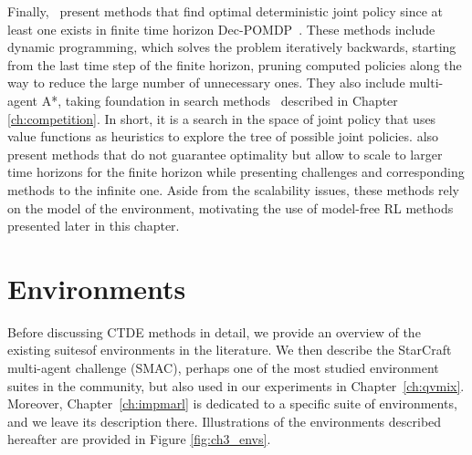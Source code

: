 Finally,~\cite{DecPomdp} present methods that find optimal deterministic joint policy since at least one exists in finite time horizon Dec-POMDP~\citep{oliehoek2008optimal}.
These methods include dynamic programming, which solves the problem iteratively backwards, starting from the last time step of the finite horizon, pruning computed policies along the way to reduce the large number of unnecessary ones.
They also include multi-agent A*, taking foundation in search methods~\citep{russel2010} described in Chapter \ref{ch:competition}.
In short, it is a search in the space of joint policy that uses value functions as heuristics to explore the tree of possible joint policies.
\cite{DecPomdp} also present methods that do not guarantee optimality but allow to scale to larger time horizons for the finite horizon while presenting challenges and corresponding methods to the infinite one.
Aside from the scalability issues, these methods rely on the model of the environment, motivating the use of model-free RL methods presented later in this chapter.

\section{Environments}
\label{sec:ch3_env}
Before discussing CTDE methods in detail, we provide an overview of the existing suites\footnotemark  of environments in the literature.
We then describe the StarCraft multi-agent challenge (SMAC), perhaps one of the most studied environment suites in the community, but also used in our experiments in Chapter~\ref{ch:qvmix}.
Moreover, Chapter~\ref{ch:impmarl} is dedicated to a specific suite of environments, and we leave its description there.
Illustrations of the environments described hereafter are provided in Figure \ref{fig:ch3_envs}.

